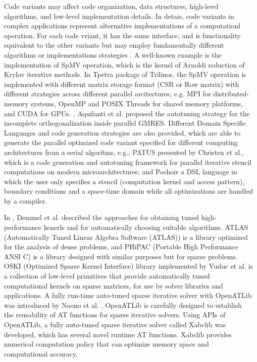 	Code variants may affect code organization, data structures, high-level algorithms, and low-level implementation details. In detais, code variants in complex applications represent alternative implementations of a computationl operation. For each code vriant, it has the same interface, and is functionality equivalent to the other variants but may employ fundamentally different algorithms or implementations strategies \cite{muralidharan2016architecture}. A well-known example is the implementation of SpMV operation, which is the kernel of Arnoldi reduction of Krylov iterative methods. In Tpetra package of Trilinos, the SpMV operation is implemented with different matrix storage format (CSR or Row matrix) with different strategies across different parallel arcitectures, e.g. MPI for distributed-memory systems, OpenMP and POSIX Threads for shared memory platforms, and CUDA for GPUs. \cite{aquilanti2011parallel}, Aquilanti et al. proposed the autotuning strategy for the incomplete orthogonalization inside parallel GMRES. Different Domain Specific Languages and code generation strategies are also provided, which are able to generate the parallel optimized code variant specified for different computing architectures from a serial algoritms, e.g., PATUS \cite{christen2011patus} presented by Christen et al., which is a code generation and autotuning framework for parallel iterative stencil computations on modern microarchitectures; and Pochoir \cite{tang2011pochoir} a DSL language in which the user only specifies a stencil (computation kernel and access pattern), boundary conditions and a space-time domain while all optimizations are handled by a compiler.
	
	In \cite{demmel2005self}, Demmel et al. described the approaches for obtaining tuned high-performance kenerls and for automatically choosing suitable algorithms. ATLAS (Automatically Tuned Linear Algebra Software (ATLAS)) \cite{whaley1998automatically} is a library optimized for the analysis of dense problems, and PHiPAC (Portable High Performance ANSI C) \cite{bilmes1997optimizing} is a library designed with similar purposes but for sparse problems. OSKI (Optimized Sparse Kernel Interface) library implemented by Vuduc et al. \cite{vuduc2005oski} is a collection of low-level primitives that provide automatically tuned computational kernels on sparse matrices, for use by solver libraries and applications. A fully run-time auto-tuned sparse iterative solver with OpenATLib was introduced by  Naono et al. \cite{naono2012fully}. OpenATLib is carefully designed to establish the reusability of AT functions for sparse iterative solvers. Using APIs of OpenATLib, a fully auto-tuned sparse iterative solver called Xabclib was developed, which has several novel runtime AT functions.  Xabclib provides numerical computation policy that can optimize memory space and computational accuracy.
	
